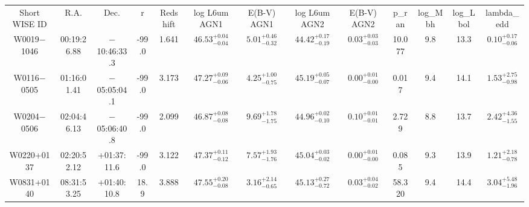 \begin{table}
\begin{tabular}{ccccccccccccc}
Short WISE ID & R.A. & Dec. & r & Redshift & log L6um AGN1 & E(B-V) AGN1 & log L6um AGN2 & E(B-V) AGN2 & p_ran & log_Mbh & log_Lbol & lambda_edd \\
W0019$-$1046 & 00:19:26.88 & $-$10:46:33.3 & -99.0 & 1.641 & $46.53^{+0.04}_{-0.04}$ & $ 5.01^{+0.46}_{-0.32}$ & $44.42^{+0.17}_{-0.19}$ & $ 0.03^{+0.03}_{-0.03}$ & 10.077 & 9.8 & 13.3 & $ 0.10^{+0.17}_{-0.06}$ \\
W0116$-$0505 & 01:16:01.41 & $-$05:05:04.1 & -99.0 & 3.173 & $47.27^{+0.09}_{-0.06}$ & $ 4.25^{+1.00}_{-0.75}$ & $45.19^{+0.05}_{-0.07}$ & $ 0.00^{+0.01}_{-0.00}$ & 0.017 & 9.4 & 14.1 & $ 1.53^{+2.75}_{-0.98}$ \\
W0204$-$0506 & 02:04:46.13 & $-$05:06:40.8 & -99.0 & 2.099 & $46.87^{+0.08}_{-0.08}$ & $ 9.69^{+1.78}_{-1.75}$ & $44.96^{+0.02}_{-0.10}$ & $ 0.10^{+0.01}_{-0.01}$ & 2.729 & 8.8 & 13.7 & $ 2.42^{+4.36}_{-1.55}$ \\
W0220+0137 & 02:20:52.12 & +01:37:11.6 & -99.0 & 3.122 & $47.37^{+0.11}_{-0.12}$ & $ 7.57^{+1.93}_{-1.76}$ & $45.04^{+0.03}_{-0.02}$ & $ 0.00^{+0.01}_{-0.00}$ & 0.085 & 9.3 & 13.9 & $ 1.21^{+2.18}_{-0.78}$ \\
W0831+0140 & 08:31:53.25 & +01:40:10.8 & 18.9 & 3.888 & $47.55^{+0.20}_{-0.08}$ & $ 3.16^{+2.14}_{-0.65}$ & $45.13^{+0.27}_{-0.72}$ & $ 0.03^{+0.04}_{-0.02}$ & 58.320 & 9.4 & 14.4 & $ 3.04^{+5.48}_{-1.96}$ \\
\end{tabular}
\end{table}
